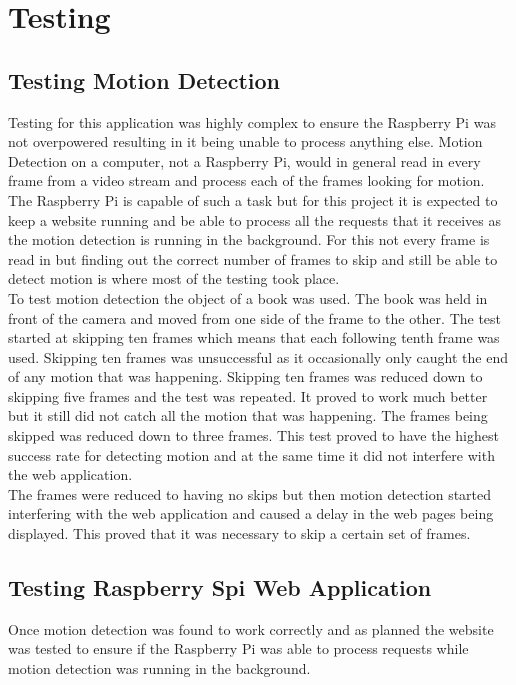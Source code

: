 \documentclass[12pt]{report}
\begin{document}
\chapter{Testing}
\label{ch:test}
%
%
\section{Testing Motion Detection}
\label{sec:motionTest}
%

Testing for this application was highly complex to ensure the Raspberry Pi was not overpowered resulting in it being unable to process anything else. Motion Detection on a computer, not a Raspberry Pi, would in general read in every frame from a video stream and process each of the frames looking for motion. The Raspberry Pi is capable of such a task but for this project it is expected to keep a website running and be able to process all the requests that it receives as the motion detection is running in the background. For this not every frame is read in but finding out the correct number of frames to skip and still be able to detect motion is where most of the testing took place.\\

To test motion detection the object of a book was used. The book was held in front of the camera and moved from one side of the frame to the other. The test started at skipping ten frames which means that each following tenth frame was used. Skipping ten frames was unsuccessful as it occasionally only caught the end of any motion that was happening. Skipping ten frames was reduced down to skipping five frames and the test was repeated. It proved to work much better but it still did not catch all the motion that was happening. The frames being skipped was reduced down to three frames. This test proved to have the highest success rate for detecting motion and at the same time it did not interfere with the web application.\\

The frames were reduced to having no skips but then motion detection started interfering with the web application and caused a delay in the web pages being displayed. This proved that it was necessary to skip a certain set of frames.\\

\section{Testing Raspberry Spi Web Application}
\label{sec:websiteTest}
%
Once motion detection was found to work correctly and as planned the website was tested to ensure if the Raspberry Pi was able to process requests while motion detection was running in the background.\\
\end{document}
